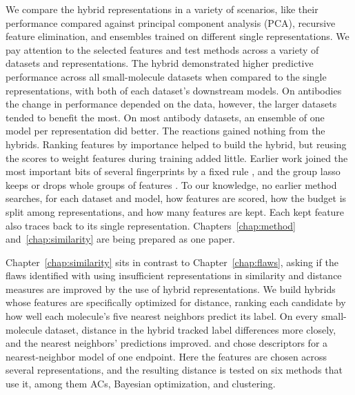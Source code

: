 We compare the hybrid representations in a variety of scenarios, like their performance compared against principal component analysis (PCA), recursive feature elimination, and ensembles trained on different single representations. We pay attention to the selected features and test methods across a variety of datasets and representations. The hybrid demonstrated higher predictive performance across all small-molecule datasets when compared to the single representations, with both of each dataset's downstream models. On antibodies the change in performance depended on the data, however, the larger datasets tended to benefit the most. On most antibody datasets, an ensemble of one model per representation did better. The reactions gained nothing from the hybrids. Ranking features by importance helped to build the hybrid, but reusing the scores to weight features during training added little.
Earlier work joined the most important bits of several fingerprints by a fixed rule \citep{Turkina2025}, and the group lasso keeps or drops whole groups of features \citep{Yuan2006}. To our knowledge, no earlier method searches, for each dataset and model, how features are scored, how the budget is split among representations, and how many features are kept. Each kept feature also traces back to its single representation. Chapters~\ref{chap:method} and~\ref{chap:similarity} are being prepared as one paper. 

Chapter~\ref{chap:similarity} sits in contrast to Chapter~\ref{chap:flaws}, asking if the flaws identified with using insufficient representations in similarity and distance measures are improved by the use of hybrid representations. We build hybrids whose features are specifically optimized for distance, ranking each candidate by how well each molecule's five nearest neighbors predict its label. On every small-molecule dataset, distance in the hybrid tracked label differences more closely, and the nearest neighbors' predictions improved.
\citet{Zheng2000} and \citet{Itskowitz2005} chose descriptors for a nearest-neighbor model of one endpoint. Here the features are chosen across several representations, and the resulting distance is tested on six methods that use it, among them ACs, Bayesian optimization, and clustering. 

